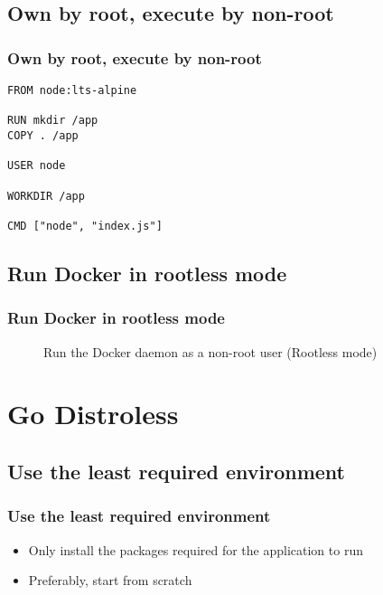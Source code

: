 \documentclass[10pt, compress]{beamer}
\begin{document}
\subsection{Own by root, execute by non-root}

\begin{frame}[fragile]
  \frametitle{Own by root, execute by non-root}
  
  \begin{verbatim}
FROM node:lts-alpine

RUN mkdir /app
COPY . /app

USER node

WORKDIR /app

CMD ["node", "index.js"]
  \end{verbatim}

\end{frame}

\subsection{Run Docker in rootless mode}

\begin{frame}[fragile]
  \frametitle{Run Docker in rootless mode}
  
  \begin{figure}
      \centering
      \caption{Run the Docker daemon as a non-root user (Rootless mode)}
  \end{figure}
\end{frame}

\section{Go Distroless}

\subsection{Use the least required environment}

\begin{frame}[fragile]
  \frametitle{Use the least required environment}
  
  \begin{itemize}
      \item Only install the packages required for the application to run
      \item Preferably, start from scratch
  \end{itemize}
\end{frame}
\end{document}

